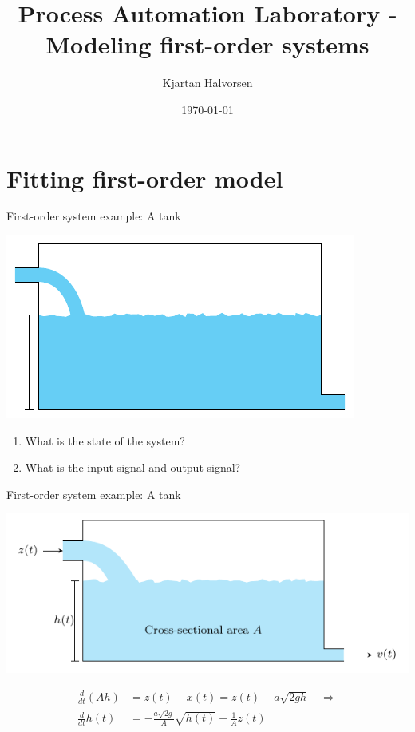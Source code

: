 \documentclass[presentation,aspectratio=169]{beamer}
\author{Kjartan Halvorsen}
\date{\today}
\title{Process Automation Laboratory - Modeling first-order systems}
\begin{document}
\maketitle

\section{Fitting first-order model}
\label{sec:org3e4b441}
\begin{frame}[label={sec:org5be9d62}]{First-order system example: A tank}
\begin{center}
\includegraphics[width=0.7\linewidth]{../../figures/tank-with-hole-no-variables}
\end{center}

\begin{enumerate}
\item What is the \alert{state} of the system?
\item What is the \alert{input signal} and \alert{output signal}?
\end{enumerate}
\end{frame}



\begin{frame}[label={sec:orgf133466}]{First-order system example: A tank}
\begin{center}
\includegraphics[width=0.7\linewidth]{../../figures/tank-with-hole-simple}
\end{center}

\begin{align*}
\frac{d}{dt} (Ah) &=  z(t) - x(t) = z(t) - a \sqrt{2gh}\quad \Rightarrow\\
\frac{d}{dt} h(t) &= - \frac{a\sqrt{2g}}{A} \sqrt{h(t)} + \frac{1}{A} z(t)
\end{align*}
\end{frame}
\end{document}
